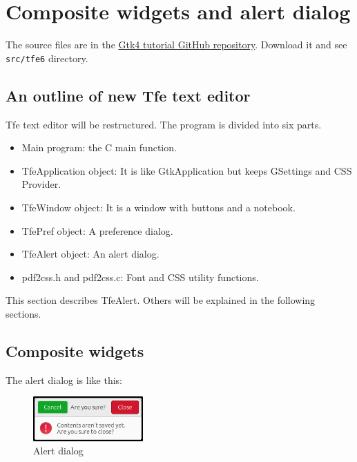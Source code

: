 \section{Composite widgets and alert
dialog}\label{composite-widgets-and-alert-dialog}

The source files are in the
\href{https://github.com/ToshioCP/Gtk4-tutorial}{Gtk4 tutorial GitHub
repository}. Download it and see \passthrough{\lstinline!src/tfe6!}
directory.

\subsection{An outline of new Tfe text
editor}\label{an-outline-of-new-tfe-text-editor}

Tfe text editor will be restructured. The program is divided into six
parts.

\begin{itemize}
\tightlist
\item
  Main program: the C main function.
\item
  TfeApplication object: It is like GtkApplication but keeps GSettings
  and CSS Provider.
\item
  TfeWindow object: It is a window with buttons and a notebook.
\item
  TfePref object: A preference dialog.
\item
  TfeAlert object: An alert dialog.
\item
  pdf2css.h and pdf2css.c: Font and CSS utility functions.
\end{itemize}

This section describes TfeAlert. Others will be explained in the
following sections.

\subsection{Composite widgets}\label{composite-widgets}

The alert dialog is like this:

\begin{figure}
\centering
\includegraphics[width=4.2cm,height=1.7cm]{../image/alert.png}
\caption{Alert dialog}
\end{figure}

